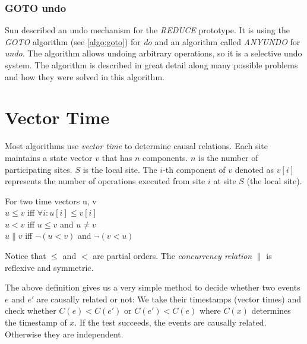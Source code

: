 \subsubsection{GOTO undo}
Sun \cite{sun02b} described an undo mechanism for the \emph{REDUCE} prototype. It is using the \emph{GOTO} algorithm (see \ref{algo:goto}) for \emph{do} and an algorithm called \emph{ANYUNDO} for \emph{undo}. The algorithm allows undoing arbitrary operations, so it is a selective undo system. The algorithm is described in great detail along many possible problems and how they were solved in this algorithm.



\section{Vector Time}
\label{sect:vectortime}

Most algorithms use \emph{vector time} to determine causal relations. Each site maintains a state vector $v$ that has $n$ components. $n$ is the number of participating sites. $S$ is the local site. The $i$-th component of $v$ denoted as $v[i]$ represents the number of operations executed from site $i$ at site $S$ (the local site). 

\begin{defn}
  For two time vectors u, v \\
  $u \leq v$ iff $\forall i : u[i] \leq v[i]$ \\
  $u < v$ iff $u \leq v$ and $u \not= v$ \\
  $u \parallel v$ iff $\neg(u < v)$ and $\neg(v < u)$
\end{defn}

Notice that $\leq$ and $<$ are partial orders. The \emph{concurrency relation} $\parallel$ is reflexive and symmetric.

The above definition gives us a very simple method to decide whether two events $e$ and $e'$ are causally related or not: We take their timestamps (vector times) and check whether $C(e) < C(e')$ or $C(e') < C(e)$ where $C(x)$ determines the timestamp of $x$. If the test succeeds, the events are causally related. Otherwise they are independent.

